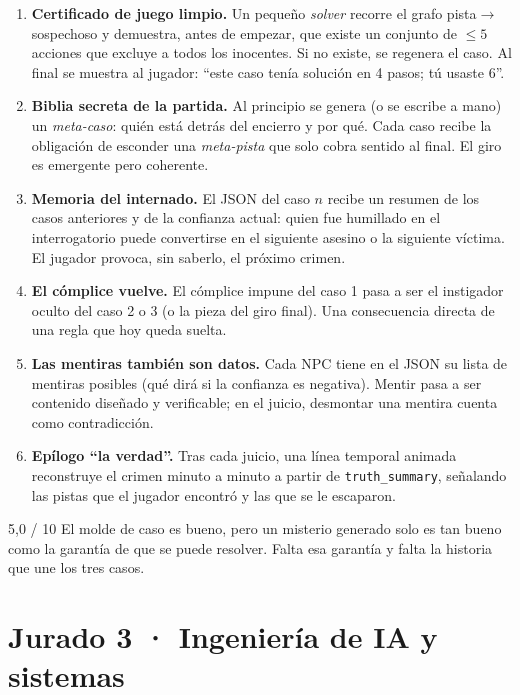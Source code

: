 \documentclass[11pt,a4paper]{article}
\begin{document}
\begin{inedito}
\begin{enumerate}
\item \textbf{Certificado de juego limpio.} Un pequeño \emph{solver} recorre el grafo
pista$\to$sospechoso y demuestra, antes de empezar, que existe un conjunto de $\leq 5$ acciones que
excluye a todos los inocentes. Si no existe, se regenera el caso. Al final se muestra al jugador:
``este caso tenía solución en 4 pasos; tú usaste 6''.
\item \textbf{Biblia secreta de la partida.} Al principio se genera (o se escribe a mano) un
\emph{meta-caso}: quién está detrás del encierro y por qué. Cada caso recibe la obligación de
esconder una \emph{meta-pista} que solo cobra sentido al final. El giro es emergente pero coherente.
\item \textbf{Memoria del internado.} El JSON del caso $n$ recibe un resumen de los casos anteriores
y de la confianza actual: quien fue humillado en el interrogatorio puede convertirse en el siguiente
asesino o la siguiente víctima. El jugador provoca, sin saberlo, el próximo crimen.
\item \textbf{El cómplice vuelve.} El cómplice impune del caso 1 pasa a ser el instigador oculto del
caso 2 o 3 (o la pieza del giro final). Una consecuencia directa de una regla que hoy queda suelta.
\item \textbf{Las mentiras también son datos.} Cada NPC tiene en el JSON su lista de mentiras
posibles (qué dirá si la confianza es negativa). Mentir pasa a ser contenido diseñado y verificable;
en el juicio, desmontar una mentira cuenta como contradicción.
\item \textbf{Epílogo ``la verdad''.} Tras cada juicio, una línea temporal animada reconstruye el
crimen minuto a minuto a partir de \texttt{truth\_summary}, señalando las pistas que el jugador
encontró y las que se le escaparon.
\end{enumerate}
\end{inedito}

\begin{veredicto}{5,0 / 10}
El molde de caso es bueno, pero un misterio generado solo es tan bueno como la garantía de que se
puede resolver. Falta esa garantía y falta la historia que une los tres casos.
\end{veredicto}

\section{Jurado 3 · Ingeniería de IA y sistemas}
\end{document}
